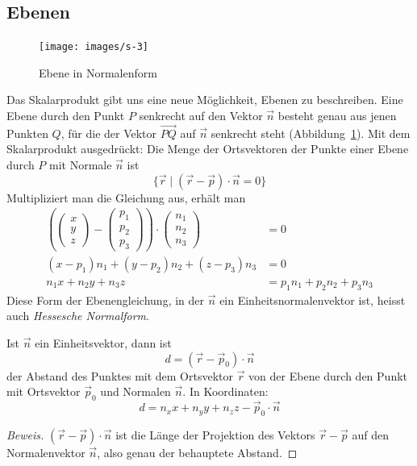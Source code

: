 \subsection{Ebenen}
\begin{figure}
\begin{center}
\texttt{[image: images/s-3]}
\end{center}
\caption{Ebene in Normalenform\label{image-normalenform}}
\end{figure}
Das Skalarprodukt gibt uns eine neue Möglichkeit, Ebenen zu
beschreiben.
Eine Ebene durch den Punkt $P$ senkrecht auf den Vektor
$\vec n$ besteht genau aus jenen Punkten $Q$, für die der Vektor
$\overset{\rightarrow}{PQ}$ auf $\vec n$ senkrecht steht
(Abbildung~\ref{image-normalenform}).
Mit dem Skalarprodukt
ausgedrückt: Die Menge der Ortsvektoren der Punkte einer Ebene durch $P$ mit
Normale $\vec n$ ist
\[
\{\vec r\;|\;(\vec r-\vec p)\cdot \vec n=0\}
\]
Multipliziert man die Gleichung aus, erhält man
\begin{align*}
\left(
\begin{pmatrix}x\\y\\z\end{pmatrix}
-\begin{pmatrix}p_1\\p_2\\p_3\end{pmatrix}\right)\cdot
\begin{pmatrix}n_1\\n_2\\n_3\end{pmatrix}&=0
\\
(x-p_1)n_1+(y-p_2)n_2+(z-p_3)n_3&=0
\\
n_1x+n_2y+n_3z&=p_1n_1+p_2n_2+p_3n_3
\end{align*}
Diese Form der Ebenengleichung, in der $\vec n$ ein Einheitsnormalenvektor ist,
heisst auch {\em Hessesche Normalform}.

\begin{satz}
Ist $\vec n$ ein Einheitsvektor, dann ist
\[
d=(\vec r-\vec p_0)\cdot \vec n
\]
der Abstand des Punktes mit dem Ortsvektor $\vec r$ von der Ebene durch
den Punkt mit Ortsvektor $\vec p_0$ und Normalen $\vec n$.
In Koordinaten:
\[
d=n_xx+n_yy+n_zz-\vec p_0\cdot\vec n
\]
\end{satz}
\begin{proof}[Beweis]
$(\vec r-\vec p)\cdot \vec n$ ist die Länge der Projektion des Vektors
$\vec r -\vec p$ auf den Normalenvektor $\vec n$, also genau der behauptete
Abstand.
\end{proof}

